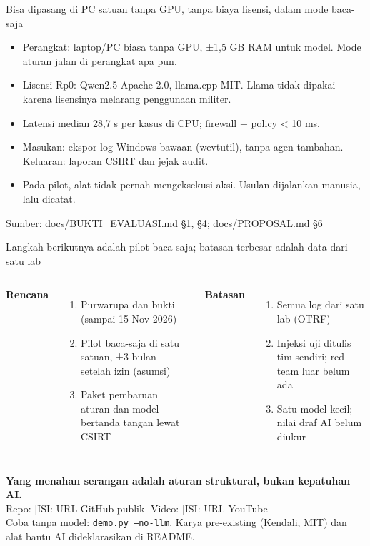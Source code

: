 \documentclass[aspectratio=169,11pt]{beamer}
\newcommand{\src}[1]{\vfill\hfill{\tiny\color{gray}Sumber: #1}}
\begin{document}
\begin{frame}{Bisa dipasang di PC satuan tanpa GPU, tanpa biaya lisensi, dalam mode baca-saja}
\begin{itemize}\setlength\itemsep{0.6em}
\item Perangkat: laptop/PC biasa tanpa GPU, ±1,5 GB RAM untuk model. Mode aturan jalan di perangkat apa pun.
\item Lisensi Rp0: Qwen2.5 Apache-2.0, llama.cpp MIT. Llama tidak dipakai karena lisensinya melarang penggunaan militer.
\item Latensi median 28,7 s per kasus di CPU; firewall + policy < 10 ms.
\item Masukan: ekspor log Windows bawaan (wevtutil), tanpa agen tambahan. Keluaran: laporan CSIRT dan jejak audit.
\item Pada pilot, alat tidak pernah mengeksekusi aksi. Usulan dijalankan manusia, lalu dicatat.
\end{itemize}
\src{docs/BUKTI\_EVALUASI.md §1, §4; docs/PROPOSAL.md §6}
\end{frame}

\begin{frame}{Langkah berikutnya adalah pilot baca-saja; batasan terbesar adalah data dari satu lab}
\begin{columns}[T]
\textbf{Rencana}
\begin{enumerate}
\item Purwarupa dan bukti (sampai 15 Nov 2026)
\item Pilot baca-saja di satu satuan, ±3 bulan setelah izin (asumsi)
\item Paket pembaruan aturan dan model bertanda tangan lewat CSIRT
\end{enumerate}
\textbf{Batasan}
\begin{enumerate}
\item Semua log dari satu lab (OTRF)
\item Injeksi uji ditulis tim sendiri; red team luar belum ada
\item Satu model kecil; nilai draf AI belum diukur
\end{enumerate}
\end{columns}
\end{frame}

\begin{frame}
\vspace{2em}
\begin{center}
{\Large\bfseries Yang menahan serangan adalah aturan struktural, bukan kepatuhan AI.}\\[1.5em]
Repo: [ISI: URL GitHub publik] \quad Video: [ISI: URL YouTube]\\[1em]
{\small\color{gray} Coba tanpa model: \texttt{demo.py --no-llm}. Karya pre-existing (Kendali, MIT) dan alat bantu AI dideklarasikan di README.}
\end{center}
\end{frame}
\end{document}
